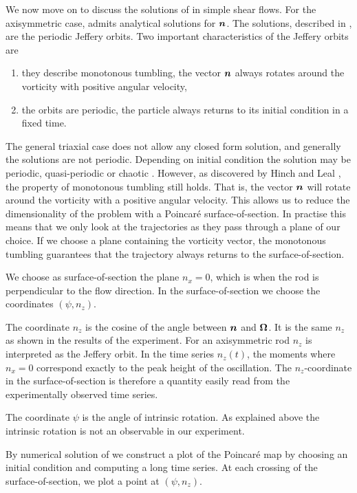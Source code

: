 \documentclass[thesis.tex]{subfiles}
\begin{document}
We now move on to discuss the solutions of  in simple shear flows. For the axisymmetric case,  admits analytical solutions for $\mbox{\boldmath$n$}$. The solutions, described in , are the periodic Jeffery orbits. Two important characteristics of the Jeffery orbits are
\begin{enumerate}
	\item they describe monotonous tumbling, the vector $\mbox{\boldmath$n$}$ always rotates around the vorticity with positive angular velocity,
	\item the orbits are periodic, the particle always returns to its initial condition in a fixed time.
\end{enumerate}
The general triaxial case does not allow any closed form solution, and generally the solutions are not periodic. Depending on initial condition the solution may be periodic, quasi-periodic or chaotic \cite{hinch1979,yarin1997}. However, as discovered by Hinch and Leal \cite{hinch1979}, the property of monotonous tumbling still holds. That is, the vector $\mbox{\boldmath$n$}$ will rotate around the vorticity with a positive angular velocity. This allows us to reduce the dimensionality of the problem with a Poincar\'e surface-of-section. In practise this means that we only look at the trajectories as they pass through a plane of our choice. If we choose a plane containing the vorticity vector, the monotonous tumbling guarantees that the trajectory always returns to the surface-of-section.

We choose as surface-of-section the plane $n_x=0$, which is when the rod is perpendicular to the flow direction. In the surface-of-section we choose the coordinates $(\psi, n_z)$. 

The coordinate $n_z$ is the cosine of the angle between $\mbox{\boldmath$n$}$ and $\mbox{\boldmath$\Omega$}$. It is the same $n_z$ as shown in the results of the experiment. For an axisymmetric rod $n_z$ is interpreted as the Jeffery orbit. In the time series $n_z(t)$, the moments where $n_x=0$ correspond exactly to the peak height of the oscillation. The $n_z$-coordinate in the surface-of-section is therefore a quantity easily read from the experimentally observed time series. 

The coordinate $\psi$ is the angle of intrinsic rotation. As explained above the intrinsic rotation is not an observable in our experiment. 

By numerical solution of  we construct a plot of the Poincar\'e map by choosing an initial condition and computing a long time series. At each crossing of the surface-of-section, we plot a point at $(\psi, n_z)$.
\end{document}
